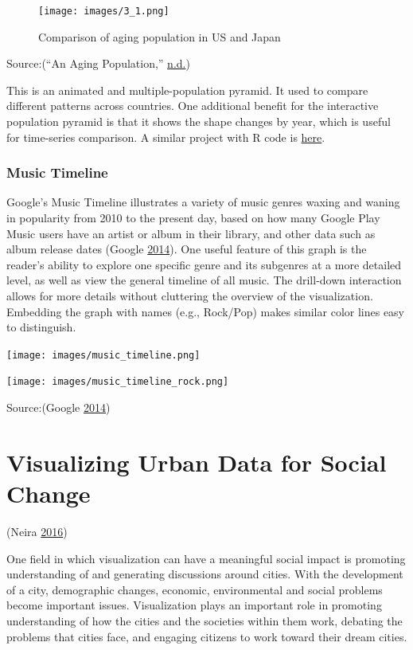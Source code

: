 \documentclass[]{book}
\begin{document}
\begin{figure}
\centering
\texttt{[image: images/3\_1.png]}
\caption{Comparison of aging population in US and Japan}
\end{figure}

Source:(``An Aging Population,'' \protect\hyperlink{ref-animated_pyramid}{n.d.})

This is an animated and multiple-population pyramid. It used to compare different patterns across countries. One additional benefit for the interactive population pyramid is that it shows the shape changes by year, which is useful for time-series comparison. A similar project with R code is \href{https://www.r-bloggers.com/who-is-old-visualizing-the-concept-of-prospective-ageing-with-animated-population-pyramids/}{here}.

\hypertarget{music-timeline}{%
\subsubsection{Music Timeline}\label{music-timeline}}

Google's Music Timeline illustrates a variety of music genres waxing and waning in popularity from 2010 to the present day, based on how many Google Play Music users have an artist or album in their library, and other data such as album release dates (Google \protect\hyperlink{ref-google_music}{2014}). One useful feature of this graph is the reader's ability to explore one specific genre and its subgenres at a more detailed level, as well as view the general timeline of all music. The drill-down interaction allows for more details without cluttering the overview of the visualization. Embedding the graph with names (e.g., Rock/Pop) makes similar color lines easy to distinguish.

\texttt{[image: images/music\_timeline.png]}

\texttt{[image: images/music\_timeline\_rock.png]}

Source:(Google \protect\hyperlink{ref-google_music}{2014})

\hypertarget{visualizing-urban-data-for-social-change}{%
\section{Visualizing Urban Data for Social Change}\label{visualizing-urban-data-for-social-change}}

(Neira \protect\hyperlink{ref-Socialchange}{2016})

One field in which visualization can have a meaningful social impact is promoting understanding of and generating discussions around cities. With the development of a city, demographic changes, economic, environmental and social problems become important issues. Visualization plays an important role in promoting understanding of how the cities and the societies within them work, debating the problems that cities face, and engaging citizens to work toward their dream cities.
\end{document}
